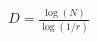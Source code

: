 \documentclass[preview]{standalone}
\begin{document}
\begin{align*}
D = \frac{\log(N)}{\log(1/r)}
\end{align*}
\end{document}
